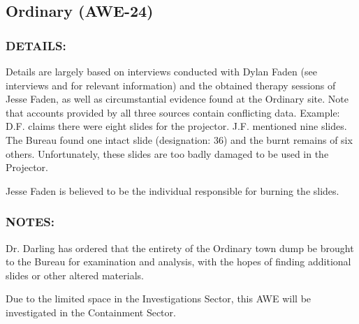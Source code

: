 \subsection*{Ordinary (AWE-24)}
\subsubsection*{DETAILS:}
\par Details are largely based on interviews conducted with Dylan
Faden (see interviews  and 
for relevant information) and the obtained therapy sessions of Jesse Faden, as
well as circumstantial evidence found at the Ordinary site. Note
that accounts provided by all three sources contain conflicting
data. Example: D.F. claims there were eight slides for the
projector. J.F. mentioned nine slides. The Bureau found one intact
slide (designation: 36) and the burnt remains of six others.
Unfortunately, these slides are too badly damaged to be used in
the Projector.
\par Jesse Faden is believed to be the individual responsible for
burning the slides.
\subsubsection*{NOTES:}
\par Dr. Darling has ordered that the entirety of the Ordinary town
dump be brought to the Bureau for examination and analysis, with
the hopes of finding additional slides or other altered materials.
\par Due to the limited space in the Investigations Sector, this AWE
will be investigated in the Containment Sector.